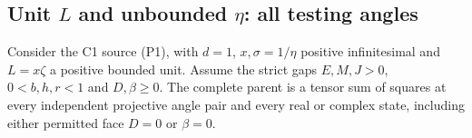 \subsection{Unit \texorpdfstring{$L$}{L} and unbounded \texorpdfstring{$\eta$}{eta}: all testing angles}
\label{component:pb0d9d28d0849}
\label{component:pda4a21937f64}

\begin{theorem}\label{thm:c1-unit-L-all-tests}
Consider the C1 source (P1), with $d=1$, $x,\sigma=1/\eta$ positive
infinitesimal and $L=x\zeta$ a positive bounded unit. Assume the
strict gaps $E,M,J>0$, $0<b,h,r<1$ and $D,\beta\ge0$. The complete parent
is a tensor sum of squares at every independent projective angle pair
and every real or complex state, including either permitted face
$D=0$ or $\beta=0$.
\end{theorem}
